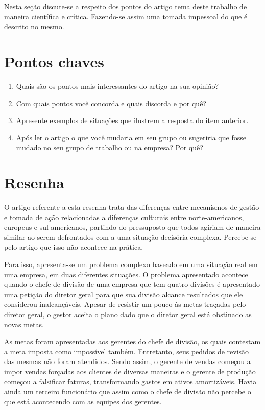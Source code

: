 Nesta seção discute-se a respeito dos pontos do artigo tema deste trabalho de maneira
científica e crítica. Fazendo-se assim uma tomada impessoal do que é descrito no mesmo.

\section{Pontos chaves}
\begin{enumerate}
\item Quais são os pontos mais interessantes do artigo na sua opinião?
\item Com quais pontos você concorda e quais discorda e por quê?
\item Apresente exemplos de situações que ilustrem a resposta do item anterior.
\item Após ler o artigo o que você mudaria em seu grupo ou sugeriria que
fosse mudado no seu grupo de trabalho ou na empresa? Por quê?
\end{enumerate}

\section{Resenha}

O artigo referente a esta resenha trata das diferenças entre mecanismos
de gestão e tomada de ação relacionadas a diferenças culturais entre
norte-americanos, europeus e sul americanos, partindo do pressuposto
que todos agiriam de maneira similar ao serem defrontados com a uma
situação decisória complexa. Percebe-se pelo artigo que isso não acontece
na prática. 

Para isso, apresenta-se um problema complexo baseado em uma situação
real em uma empresa, em duas diferentes situações. O problema apresentado
acontece quando o chefe de divisão de uma empresa que tem quatro divisões
é apresentado uma petição do diretor geral para que sua divisão alcance
resultados que ele considerou inalcançáveis. Apesar de resistir um
pouco às metas traçadas pelo diretor geral, o gestor aceita o plano
dado que o diretor geral está obstinado as novas metas.

As metas foram apresentadas aos gerentes do chefe de divisão, os quais
contestam a meta imposta como impossível também. Entretanto, seus
pedidos de revisão das mesmas não foram atendidos. Sendo assim, o
gerente de vendas começou a impor vendas forçadas aos clientes de
diversas maneiras e o gerente de produção começou a falsificar faturas,
transformando gastos em ativos amortizáveis. Havia ainda um terceiro
funcionário que assim como o chefe de divisão não percebe o que está
acontecendo com as equipes dos gerentes.

